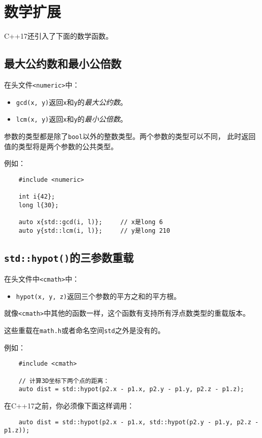 \section{数学扩展}
C++17还引入了下面的数学函数。

\subsection{最大公约数和最小公倍数}
在头文件\texttt{<numeric>}中：
\begin{itemize}
    \item \texttt{gcd(x, y)}返回\texttt{x}和\texttt{y}的\emph{最大公约数}。
    \item \texttt{lcm(x, y)}返回\texttt{x}和\texttt{y}的\emph{最小公倍数}。
\end{itemize}
参数的类型都是除了\texttt{bool}以外的整数类型。两个参数的类型可以不同，
此时返回值的类型将是两个参数的公共类型。

例如：
\begin{lstlisting}
    #include <numeric>

    int i{42};
    long l{30};

    auto x{std::gcd(i, l)};     // x是long 6
    auto y{std::lcm(i, l)};     // y是long 210
\end{lstlisting}

\subsection{\texttt{std::hypot()}的三参数重载}
在头文件中\texttt{<cmath>}中：
\begin{itemize}
    \item \texttt{hypot(x, y, z)}返回三个参数的平方之和的平方根。
\end{itemize}
就像\texttt{<cmath>}中其他的函数一样，这个函数有支持所有浮点数类型的重载版本。

这些重载在\texttt{math.h}或者命名空间\texttt{std}之外是没有的。

例如：
\begin{lstlisting}
    #include <cmath>

    // 计算3D坐标下两个点的距离：
    auto dist = std::hypot(p2.x - p1.x, p2.y - p1.y, p2.z - p1.z);
\end{lstlisting}
在C++17之前，你必须像下面这样调用：
\begin{lstlisting}
    auto dist = std::hypot(p2.x - p1.x, std::hypot(p2.y - p1.y, p2.z - p1.z));
\end{lstlisting}

